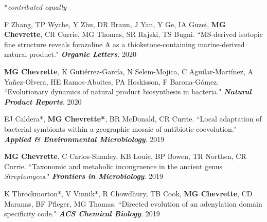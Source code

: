 


\begin{cvpubs}

\cvpub
{\hspace{-1cm} *\textit{contributed equally}} %
{}

\cvpub
{F Zhang, TP Wyche, Y Zhu, DR Braun, J Yan, Y Ge, IA Guzei, \textbf{MG Chevrette}, CR Currie, MG Thomas, SR Rajski, TS Bugni. ``MS-derived isotopic fine structure reveals forazoline A as a thioketone-containing marine-derived natural product." \textit{\textbf{Organic Letters}}. \textbf{\textit{}}}
{2020}

\end{cvpubs} \begin{cvpubs}

\cvpub
{\textbf{MG Chevrette}, K Guti\'{e}rrez-Garc\'{i}a, N Selem-Mojica, C Aguilar-Mart\'{i}nez, A Ya\~{n}ez-Olvera, HE Ramos-Aboites, PA Hoskisson, F Barona-G\'{o}mez. ``Evolutionary dynamics of natural product biosynthesis in bacteria." \textit{\textbf{Natural Product Reports}}. \textbf{\textit{}}}
{2020}

\cvpub
{EJ Caldera*, \textbf{MG Chevrette*}, BR McDonald, CR Currie. ``Local adaptation of bacterial symbionts within a geographic mosaic of antibiotic coevolution." \textit{\textbf{Applied \& Environmental Microbiology}}. \textbf{\textit{}}}
{2019}

\cvpub
{\textbf{MG Chevrette}, C Carlos-Shanley, KB Louie, BP Bowen, TR Northen, CR Currie. ``Taxonomic and metabolic incongruence in the ancient genus \textit{Streptomyces}." \textit{\textbf{Frontiers in Microbiology}}. \textbf{\textit{}}}
{2019}

\cvpub
{K Throckmorton*, V Vinnik*, R Chowdhury, TB Cook, \textbf{MG Chevrette}, CD Maranas, BF Pfleger, MG Thomas. ``Directed evolution of an adenylation domain specificity code." \textit{\textbf{ACS Chemical Biology}}. \textbf{\textit{}}}
{2019}


\end{cvpubs}
